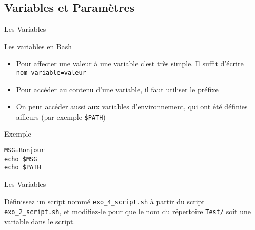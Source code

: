 \subsection{Variables et Paramètres}
\begin{frame}[fragile]{Les Variables}
\begin{block}{Les variables en Bash}
\begin{itemize}
\item Pour affecter une valeur à une variable c'est très simple. Il suffit d'écrire \texttt{nom\_variable=valeur}
\item Pour accéder au contenu d'une variable, il faut utiliser le préfixe \lin{\$}
\item On peut accéder aussi aux variables d'environnement, qui ont été définies ailleurs (par exemple \texttt{\$PATH}) 
\end{itemize}
\end{block}

\begin{block}{Exemple}
\begin{verbatim}
MSG=Bonjour
echo $MSG
echo $PATH
\end{verbatim}
\end{block}

  \begin{exercicelet}{Les Variables}
    \begin{questions}
    \item Définissez un script nommé \texttt{exo\_4\_script.sh} à partir du script \texttt{exo\_2\_script.sh}, et modifiez-le pour que le nom du répertoire \texttt{Test/} soit une variable dans le script.
    \end{questions}
  \end{exercicelet}
  
\end{frame}

